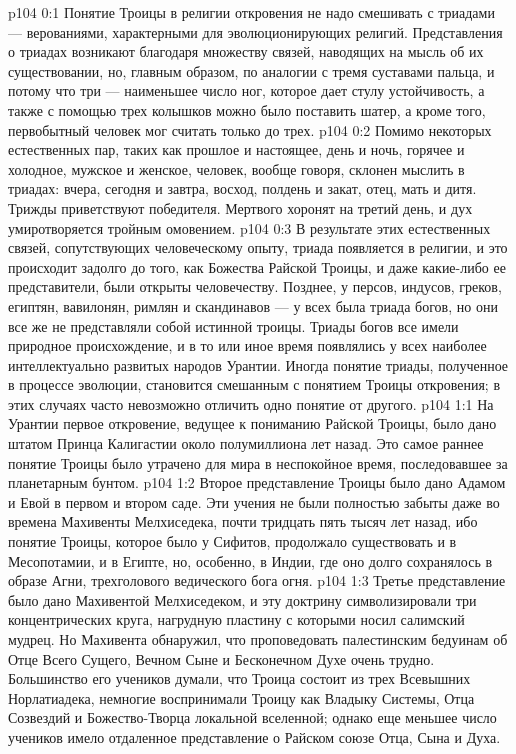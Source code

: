 \vs p104 0:1 Понятие Троицы в религии откровения не надо смешивать с триадами --- верованиями, характерными для эволюционирующих религий. Представления о триадах возникают благодаря множеству связей, наводящих на мысль об их существовании, но, главным образом, по аналогии с тремя суставами пальца, и потому что три --- наименьшее число ног, которое дает стулу устойчивость, а также с помощью трех колышков можно было поставить шатер, а кроме того, первобытный человек мог считать только до трех.
\vs p104 0:2 Помимо некоторых естественных пар, таких как прошлое и настоящее, день и ночь, горячее и холодное, мужское и женское, человек, вообще говоря, склонен мыслить в триадах: вчера, сегодня и завтра, восход, полдень и закат, отец, мать и дитя. Трижды приветствуют победителя. Мертвого хоронят на третий день, и дух умиротворяется тройным омовением.
\vs p104 0:3 В результате этих естественных связей, сопутствующих человеческому опыту, триада появляется в религии, и это происходит задолго до того, как Божества Райской Троицы, и даже какие\hyp{}либо ее представители, были открыты человечеству. Позднее, у персов, индусов, греков, египтян, вавилонян, римлян и скандинавов --- у всех была триада богов, но они все же не представляли собой истинной троицы. Триады богов все имели природное происхождение, и в то или иное время появлялись у всех наиболее интеллектуально развитых народов Урантии. Иногда понятие триады, полученное в процессе эволюции, становится смешанным с понятием Троицы откровения; в этих случаях часто невозможно отличить одно понятие от другого.
\vs p104 1:1 На Урантии первое откровение, ведущее к пониманию Райской Троицы, было дано штатом Принца Калигастии около полумиллиона лет назад. Это самое раннее понятие Троицы было утрачено для мира в неспокойное время, последовавшее за планетарным бунтом.
\vs p104 1:2 Второе представление Троицы было дано Адамом и Евой в первом и втором саде. Эти учения не были полностью забыты даже во времена Махивенты Мелхиседека, почти тридцать пять тысяч лет назад, ибо понятие Троицы, которое было у Сифитов, продолжало существовать и в Месопотамии, и в Египте, но, особенно, в Индии, где оно долго сохранялось в образе Агни, трехголового ведического бога огня.
\vs p104 1:3 Третье представление было дано Махивентой Мелхиседеком, и эту доктрину символизировали три концентрических круга, нагрудную пластину с которыми носил салимский мудрец. Но Махивента обнаружил, что проповедовать палестинским бедуинам об Отце Всего Сущего, Вечном Сыне и Бесконечном Духе очень трудно. Большинство его учеников думали, что Троица состоит из трех Всевышних Норлатиадека, немногие воспринимали Троицу как Владыку Системы, Отца Созвездий и Божество\hyp{}Творца локальной вселенной; однако еще меньшее число учеников имело отдаленное представление о Райском союзе Отца, Сына и Духа.
